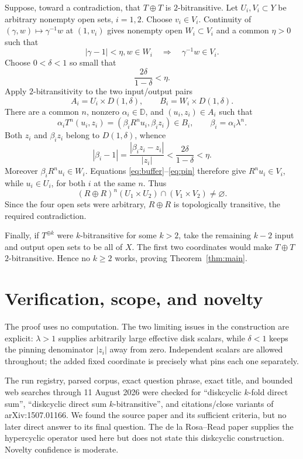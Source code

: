 \documentclass[11pt]{article}
\newcommand{\D}{\mathbb D}
\begin{document}
Suppose, toward a contradiction, that $T\oplus T$ is $2$-bitransitive.
Let $U_i,V_i\subset Y$ be arbitrary nonempty open sets, $i=1,2$.  Choose
$v_i\in V_i$.  Continuity of $(\gamma,w)\mapsto\gamma^{-1}w$ at
$(1,v_i)$ gives nonempty open $W_i\subset V_i$ and a common $\eta>0$
such that
\begin{equation}\label{eq:buffer}
 |\gamma-1|<\eta, w\in W_i
 \quad\Longrightarrow\quad \gamma^{-1}w\in V_i.
\end{equation}
Choose $0<\delta<1$ so small that
\[
 \frac{2\delta}{1-\delta}<\eta.
\]
Apply $2$-bitransitivity to the two input/output pairs
\[
 A_i=U_i\times D(1,\delta),\qquad
 B_i=W_i\times D(1,\delta).
\]
There are a common $n$, nonzero $\alpha_i\in\D$, and
$(u_i,z_i)\in A_i$ such that
\[
 \alpha_iT^n(u_i,z_i)
   =(\beta_iR^nu_i,\beta_i z_i)\in B_i,
 \qquad \beta_i=\alpha_i\lambda^n.
\]
Both $z_i$ and $\beta_i z_i$ belong to $D(1,\delta)$, whence
\begin{equation}\label{eq:pin}
 |\beta_i-1|
 =\frac{|\beta_i z_i-z_i|}{|z_i|}
 <\frac{2\delta}{1-\delta}<\eta.
\end{equation}
Moreover $\beta_iR^nu_i\in W_i$.  Equations
\eqref{eq:buffer}--\eqref{eq:pin} therefore give
$R^nu_i\in V_i$, while $u_i\in U_i$, for both $i$ at the same $n$.
Thus
\[
 (R\oplus R)^n(U_1\times U_2)\cap(V_1\times V_2)\ne\varnothing.
\]
Since the four open sets were arbitrary, $R\oplus R$ is topologically
transitive, the required contradiction.

Finally, if $T^{\oplus k}$ were $k$-bitransitive for some $k>2$, take
the remaining $k-2$ input and output open sets to be all of $X$.  The
first two coordinates would make $T\oplus T$ $2$-bitransitive.  Hence no
$k\ge2$ works, proving Theorem~\ref{thm:main}.

\section{Verification, scope, and novelty}

The proof uses no computation.  The two limiting issues in the
construction are explicit: $\lambda>1$ supplies arbitrarily large
effective disk scalars, while $\delta<1$ keeps the pinning denominator
$|z_i|$ away from zero.  Independent scalars are allowed throughout; the
added fixed coordinate is precisely what pins each one separately.

The run registry, parsed corpus, exact question phrase, exact title, and
bounded web searches through 11 August 2026 were checked for
``diskcyclic $k$-fold direct sum'', ``diskcyclic direct sum
$k$-bitransitive'', and citations/close variants of arXiv:1507.01166.  We
found the source paper and its sufficient criteria, but no later direct
answer to its final question.  The de la Rosa--Read paper supplies the
hypercyclic operator used here but does not state this diskcyclic
construction.  Novelty confidence is moderate.
\end{document}
